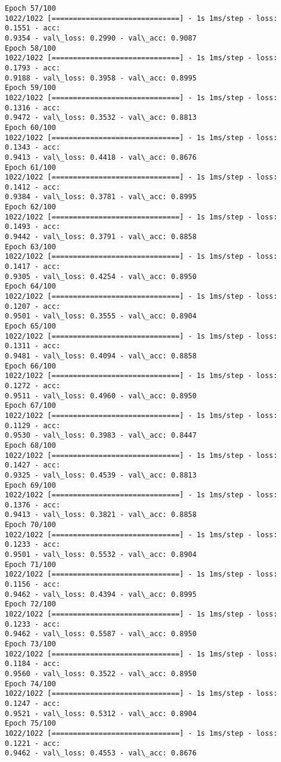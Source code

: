 \documentclass[11pt]{article}
\begin{document}
\begin{Verbatim}[commandchars=\\\{\}]
Epoch 57/100
1022/1022 [==============================] - 1s 1ms/step - loss: 0.1551 - acc:
0.9354 - val\_loss: 0.2990 - val\_acc: 0.9087
Epoch 58/100
1022/1022 [==============================] - 1s 1ms/step - loss: 0.1793 - acc:
0.9188 - val\_loss: 0.3958 - val\_acc: 0.8995
Epoch 59/100
1022/1022 [==============================] - 1s 1ms/step - loss: 0.1316 - acc:
0.9472 - val\_loss: 0.3532 - val\_acc: 0.8813
Epoch 60/100
1022/1022 [==============================] - 1s 1ms/step - loss: 0.1343 - acc:
0.9413 - val\_loss: 0.4418 - val\_acc: 0.8676
Epoch 61/100
1022/1022 [==============================] - 1s 1ms/step - loss: 0.1412 - acc:
0.9384 - val\_loss: 0.3781 - val\_acc: 0.8995
Epoch 62/100
1022/1022 [==============================] - 1s 1ms/step - loss: 0.1493 - acc:
0.9442 - val\_loss: 0.3791 - val\_acc: 0.8858
Epoch 63/100
1022/1022 [==============================] - 1s 1ms/step - loss: 0.1417 - acc:
0.9305 - val\_loss: 0.4254 - val\_acc: 0.8950
Epoch 64/100
1022/1022 [==============================] - 1s 1ms/step - loss: 0.1207 - acc:
0.9501 - val\_loss: 0.3555 - val\_acc: 0.8904
Epoch 65/100
1022/1022 [==============================] - 1s 1ms/step - loss: 0.1311 - acc:
0.9481 - val\_loss: 0.4094 - val\_acc: 0.8858
Epoch 66/100
1022/1022 [==============================] - 1s 1ms/step - loss: 0.1272 - acc:
0.9511 - val\_loss: 0.4960 - val\_acc: 0.8950
Epoch 67/100
1022/1022 [==============================] - 1s 1ms/step - loss: 0.1129 - acc:
0.9530 - val\_loss: 0.3983 - val\_acc: 0.8447
Epoch 68/100
1022/1022 [==============================] - 1s 1ms/step - loss: 0.1427 - acc:
0.9325 - val\_loss: 0.4539 - val\_acc: 0.8813
Epoch 69/100
1022/1022 [==============================] - 1s 1ms/step - loss: 0.1376 - acc:
0.9413 - val\_loss: 0.3821 - val\_acc: 0.8858
Epoch 70/100
1022/1022 [==============================] - 1s 1ms/step - loss: 0.1233 - acc:
0.9501 - val\_loss: 0.5532 - val\_acc: 0.8904
Epoch 71/100
1022/1022 [==============================] - 1s 1ms/step - loss: 0.1156 - acc:
0.9462 - val\_loss: 0.4394 - val\_acc: 0.8995
Epoch 72/100
1022/1022 [==============================] - 1s 1ms/step - loss: 0.1233 - acc:
0.9462 - val\_loss: 0.5587 - val\_acc: 0.8950
Epoch 73/100
1022/1022 [==============================] - 1s 1ms/step - loss: 0.1184 - acc:
0.9560 - val\_loss: 0.3522 - val\_acc: 0.8950
Epoch 74/100
1022/1022 [==============================] - 1s 1ms/step - loss: 0.1247 - acc:
0.9521 - val\_loss: 0.5312 - val\_acc: 0.8904
Epoch 75/100
1022/1022 [==============================] - 1s 1ms/step - loss: 0.1221 - acc:
0.9462 - val\_loss: 0.4553 - val\_acc: 0.8676

\end{Verbatim}
\end{document}

